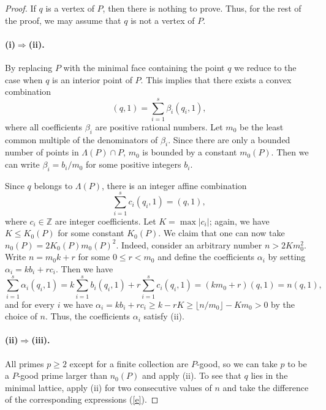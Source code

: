 \documentclass{daj}
\renewcommand{\le}{\leqslant}
\renewcommand{\ge}{\geqslant}
\newcommand{\Z}{\mathbb Z}
\theoremstyle{definition}
\theoremstyle{remark}
\theoremstyle{definition}
\theoremstyle{definition}
\begin{document}
\begin{proof}
If $q$ is a vertex of $P$, then there is nothing to prove. Thus, for the rest of the proof, we may assume that $q$ is not a vertex of $P$.

\paragraph{(i)$\Rightarrow$(ii).} By replacing $P$ with the minimal face containing the point $q$ we reduce to the case when $q$ is an interior point of $P$.
This implies that there exists a convex combination 
\begin{equation*}
    (q, 1) = \sum_{i = 1}^s \beta_i (q_i, 1),
\end{equation*}
where all coefficients $\beta_i$ are positive rational numbers. Let $m_0$ be the least common multiple of the denominators of $\beta_i$. Since there are only a bounded number of points in $\Lambda(P) \cap P$, $m_0$ is bounded by a constant $m_0(P)$. Then we can write $\beta_i = b_i / m_0$ for some positive integers $b_i$.

Since $q$ belongs to $\Lambda(P)$, there is an integer affine combination
\begin{equation}
    \sum_{i = 1}^s c_i (q_i, 1) = (q, 1),
\end{equation}
where $c_i \in \Z$ are integer coefficients. Let $K = \max |c_i|$; again, we have $K \le K_0(P)$ for some constant $K_0(P)$. We claim that one can now take $n_0(P) = 2 K_0(P) m_0(P)^2$. Indeed, consider an arbitrary number $n > 2K m_0^2$. Write $n =  m_0 k + r$ for some $0 \le r < m_0$ and define the coefficients $\alpha_i$ by setting $\alpha_i = k b_i + r c_i$. Then we have
\begin{equation}
    \sum_{i=1}^s \alpha_i(q_i, 1) = k \sum_{i=1}^s b_i(q_i, 1) + r \sum_{i = 1}^s c_i(q_i, 1) = (km_0 +r)(q, 1) = n(q, 1),
\end{equation}
and for every $i$ we have $\alpha_i = kb_i + rc_i \ge k - rK \ge \lfloor n / m_0\rfloor - K m_0 > 0$ by the choice of $n$. Thus, the coefficients $\alpha_i$ satisfy (ii). 

\paragraph{(ii)$\Rightarrow$(iii).} All primes $p\ge 2$ except for a finite collection are $P$-good, so we can take $p$ to be a $P$-good prime larger than $n_0(P)$ and apply (ii). To see that $q$ lies in the minimal lattice, apply (ii) for two consecutive values of $n$ and take the difference of the corresponding expressions (\ref{e}).


\end{proof}
\end{document}
